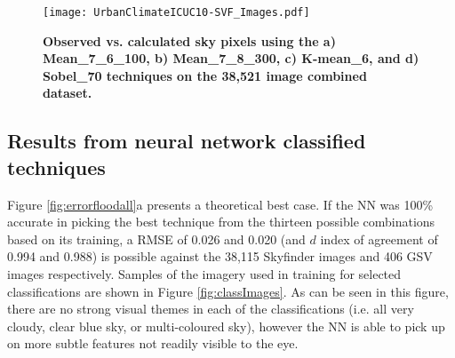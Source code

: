 \documentclass[final,3p,times,authoryear]{elsarticle}
\begin{document}
\begin{figure}
\centering
\texttt{[image: UrbanClimateICUC10-SVF\_Images.pdf]} 
\caption{\textbf{Observed vs. calculated sky pixels using the a) Mean\_7\_6\_100, b) Mean\_7\_8\_300, c) K-mean\_6, and d) Sobel\_70 techniques on the 38,521 image combined dataset.} }
\label{fig:errorallcombined}
\end{figure}






\subsection{Results from neural network classified techniques}\label{sec:resultsnn}
Figure \ref{fig:errorfloodall}a presents a theoretical best case. If the NN was 100\% accurate in picking the best technique from the thirteen possible combinations based on its training, a RMSE of 0.026 and 0.020 (and $d$ index of agreement of 0.994 and 0.988) is possible against the 38,115 Skyfinder images and 406 GSV images respectively. Samples of the imagery used in training for selected classifications are shown in Figure \ref{fig:classImages}. As can be seen in this figure, there are no strong visual themes in each of the classifications (i.e. all very cloudy, clear blue sky, or multi-coloured sky), however the NN is able to pick up on more subtle features not readily visible to the eye. 
\end{document}
